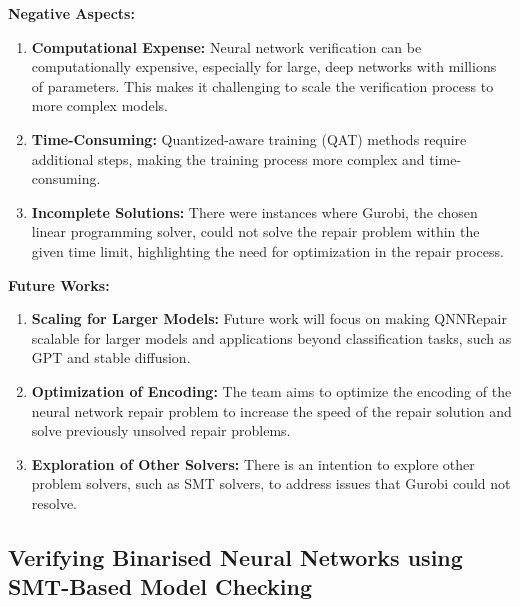 \documentclass[conference]{IEEEtran}
\begin{document}
\textbf{Negative Aspects:}
\begin{enumerate}
    \item \textbf{Computational Expense:} Neural network verification can be computationally expensive, especially for large, deep networks with millions of parameters. This makes it challenging to scale the verification process to more complex models.
    \item \textbf{Time-Consuming:} Quantized-aware training (QAT) methods require additional steps, making the training process more complex and time-consuming.
    \item \textbf{Incomplete Solutions:} There were instances where Gurobi, the chosen linear programming solver, could not solve the repair problem within the given time limit, highlighting the need for optimization in the repair process.
\end{enumerate}

\textbf{Future Works:}
\begin{enumerate}
    \item \textbf{Scaling for Larger Models:} Future work will focus on making QNNRepair scalable for larger models and applications beyond classification tasks, such as GPT and stable diffusion.
    \item \textbf{Optimization of Encoding:} The team aims to optimize the encoding of the neural network repair problem to increase the speed of the repair solution and solve previously unsolved repair problems.
    \item \textbf{Exploration of Other Solvers:} There is an intention to explore other problem solvers, such as SMT solvers, to address issues that Gurobi could not resolve.
\end{enumerate}

\subsection{Verifying Binarised Neural Networks using SMT-Based Model
Checking \cite{c6}}
\end{document}
